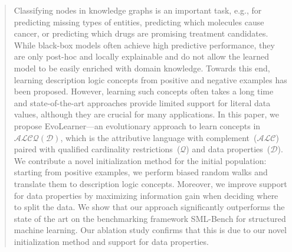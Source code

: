 
\begin{abstract}
Classifying nodes in knowledge graphs is an important task, e.g., for predicting missing types of entities, predicting which molecules cause cancer, or predicting which drugs are promising treatment candidates. While black-box models often achieve high predictive performance, they are only post-hoc and locally explainable and do not allow the learned model to be easily enriched with domain knowledge. Towards this end, learning description logic concepts from positive and negative examples has been proposed. However, learning such concepts often takes a long time and state-of-the-art approaches provide limited support for literal data values, although they are crucial for many applications. In this paper, we propose EvoLearner---an evolutionary approach to learn concepts in $\mathcal{ALCQ(D)}$, which is the attributive language with complement~($\mathcal{ALC}$) paired with qualified cardinality restrictions~($\mathcal{Q}$) and data properties~($\mathcal{D}$). We contribute a novel initialization method for the initial population: starting from positive examples, we perform biased random walks and translate them to description logic concepts. Moreover, we improve support for data properties by maximizing information gain when deciding where to split the data. We show that our approach significantly outperforms the state of the art on the benchmarking framework SML-Bench for structured machine learning. Our ablation study confirms that this is due to our novel initialization method and support for data properties.

\end{abstract}

\maketitle
